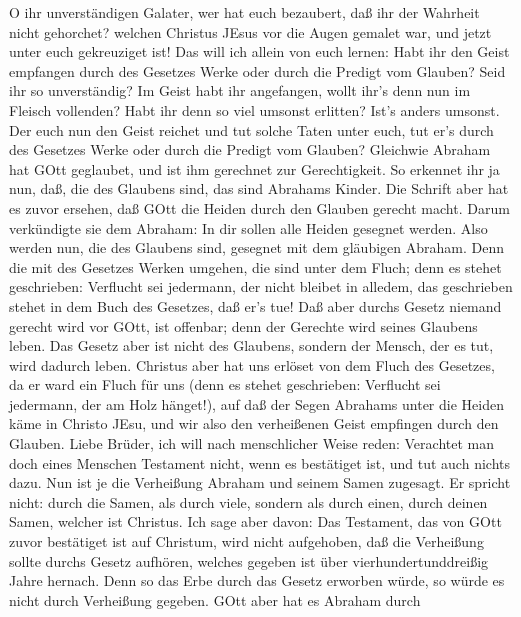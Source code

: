  O ihr unverständigen Galater, wer hat euch bezaubert, daß
ihr der Wahrheit nicht gehorchet? welchen Christus JEsus vor die Augen
gemalet war, und jetzt unter euch gekreuziget ist!  Das will
ich allein von euch lernen: Habt ihr den Geist empfangen durch des
Gesetzes Werke oder durch die Predigt vom Glauben?  Seid ihr
so unverständig? Im Geist habt ihr angefangen, wollt ihr's denn nun im
Fleisch vollenden?  Habt ihr denn so viel umsonst erlitten?
Ist's anders umsonst.  Der euch nun den Geist reichet und
tut solche Taten unter euch, tut er's durch des Gesetzes Werke oder
durch die Predigt vom Glauben?  Gleichwie Abraham hat GOtt
geglaubet, und ist ihm gerechnet zur Gerechtigkeit.  So
erkennet ihr ja nun, daß, die des Glaubens sind, das sind Abrahams
Kinder.  Die Schrift aber hat es zuvor ersehen, daß GOtt die
Heiden durch den Glauben gerecht macht. Darum verkündigte sie dem
Abraham: In dir sollen alle Heiden gesegnet werden.  Also
werden nun, die des Glaubens sind, gesegnet mit dem gläubigen Abraham.
 Denn die mit des Gesetzes Werken umgehen, die sind unter
dem Fluch; denn es stehet geschrieben: Verflucht sei jedermann, der
nicht bleibet in alledem, das geschrieben stehet in dem Buch des
Gesetzes, daß er's tue!  Daß aber durchs Gesetz niemand
gerecht wird vor GOtt, ist offenbar; denn der Gerechte wird seines
Glaubens leben.  Das Gesetz aber ist nicht des Glaubens,
sondern der Mensch, der es tut, wird dadurch leben. 
Christus aber hat uns erlöset von dem Fluch des Gesetzes, da er ward ein
Fluch für uns (denn es stehet geschrieben: Verflucht sei jedermann, der
am Holz hänget!),  auf daß der Segen Abrahams unter die
Heiden käme in Christo JEsu, und wir also den verheißenen Geist
empfingen durch den Glauben.  Liebe Brüder, ich will nach
menschlicher Weise reden: Verachtet man doch eines Menschen Testament
nicht, wenn es bestätiget ist, und tut auch nichts dazu. 
Nun ist je die Verheißung Abraham und seinem Samen zugesagt. Er spricht
nicht: durch die Samen, als durch viele, sondern als durch einen, durch
deinen Samen, welcher ist Christus.  Ich sage aber davon:
Das Testament, das von GOtt zuvor bestätiget ist auf Christum, wird
nicht aufgehoben, daß die Verheißung sollte durchs Gesetz aufhören,
welches gegeben ist über vierhundertunddreißig Jahre hernach.
 Denn so das Erbe durch das Gesetz erworben würde, so würde
es nicht durch Verheißung gegeben. GOtt aber hat es Abraham durch
